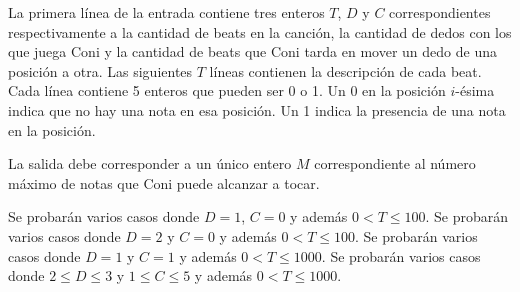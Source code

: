 \documentclass{oci}
\begin{document}
\begin{inputDescription}
  La primera línea de la entrada contiene tres enteros $T$, $D$ y $C$
  correspondientes respectivamente a la cantidad de beats en la canción, la
  cantidad de dedos con los que juega Coni y la cantidad de beats que Coni
  tarda en mover un dedo de una posición a otra.
  Las siguientes $T$ líneas contienen la descripción de cada beat.
  Cada línea contiene 5 enteros que pueden ser 0 o 1.
  Un 0 en la posición $i$-ésima indica que no hay una nota en esa posición.
  Un 1 indica la presencia de una nota en la posición.
\end{inputDescription}

\begin{outputDescription}
  La salida debe corresponder a un único entero $M$ correspondiente al número
  máximo de notas que Coni puede alcanzar a tocar.
\end{outputDescription}

\begin{scoreDescription}
   Se probarán varios casos donde $D = 1$, $C = 0$ y además $0 < T \le 100$.
   Se probarán varios casos donde $D = 2$ y $C = 0$ y además $0 < T \le 100$.
   Se probarán varios casos donde $D = 1$ y $C = 1$ y además $0 < T \le 1000$.
   Se probarán varios casos donde $2 \le D \le 3$ y $1 \le C \le 5$ y
  además $0 < T \le 1000$.
\end{scoreDescription}

\begin{sampleDescription}
\end{sampleDescription}
\end{document}
